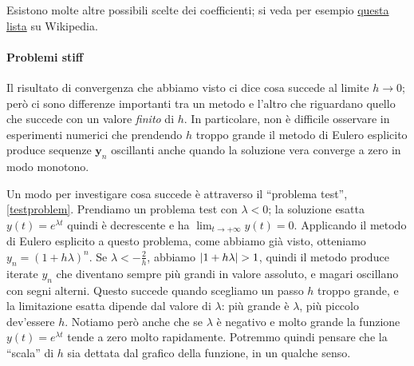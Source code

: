 \documentclass[a4paper]{report}
\DeclarePairedDelimiter{\abs}{\lvert}{\rvert}
\theoremstyle{definiton}
\theoremstyle{remark}
\newcommand{\y}{\mathbf{y}}
\begin{document}
Esistono molte altre possibili scelte dei coefficienti; si veda per esempio \href{https://en.wikipedia.org/wiki/List_of_Runge%E2%80%93Kutta_methods}{questa lista} su Wikipedia.

\paragraph{Problemi stiff}

Il risultato di convergenza che abbiamo visto ci dice cosa succede al limite $h \to 0$; però ci sono differenze importanti tra un metodo e l'altro che riguardano quello che succede con un valore \emph{finito} di $h$. In particolare, non è difficile osservare in esperimenti numerici che prendendo $h$ troppo grande il metodo di Eulero esplicito produce sequenze $\y_n$ oscillanti anche quando la soluzione vera converge a zero in modo monotono.

Un modo per investigare cosa succede è attraverso il ``problema test'', \eqref{testproblem}. Prendiamo un problema test con $\lambda < 0$; la soluzione esatta $y(t) = e^{\lambda t}$ quindi è decrescente e ha $\lim_{t\to+\infty} y(t) = 0$. Applicando il metodo di Eulero esplicito a questo problema, come abbiamo già visto, otteniamo $y_n = (1+h\lambda)^n$. Se $\lambda < -\frac{2}{h}$, abbiamo $\abs{1+h\lambda} > 1$, quindi il metodo produce iterate $y_n$ che diventano sempre più grandi in valore assoluto, e magari oscillano con segni alterni. Questo succede quando scegliamo un passo $h$ troppo grande, e la limitazione esatta dipende dal valore di $\lambda$: più grande è $\lambda$, più piccolo dev'essere $h$. Notiamo però anche che se $\lambda$ è negativo e molto grande la funzione $y(t) = e^{\lambda t}$ tende a zero molto rapidamente. Potremmo quindi pensare che la ``scala'' di $h$ sia dettata dal grafico della funzione, in un qualche senso.
\end{document}

